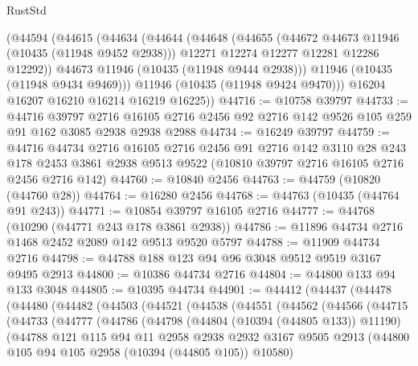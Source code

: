 \begin{lexlean}{RustStd}
\begin{coremodule}
      (@44594
        (@44615
          (@44634
            (@44644
              (@44648
                (@44655
                  (@44672 @44673 @11946 (@10435 (@11948 @9452 @2938)))
                  @12271
                  @12274
                  @12277
                  @12281
                  @12286
                  @12292))
              @44673
              @11946
              (@10435 (@11948 @9444 @2938)))
            @11946
            (@10435 (@11948 @9434 @9469)))
          @11946
          (@10435 (@11948 @9424 @9470)))
        @16204
        @16207
        @16210
        @16214
        @16219
        @16225))
@44716 := @10758 @39797
@44733 := @44716
    @39797
    @2716
    @16105
    @2716
    @2456
    @92
    @2716
    @142
    @9526
    @105
    @259
    @91
    @162
    @3085
    @2938
    @2938
    @2988
@44734 := @16249 @39797
@44759 := @44716
    @44734
    @2716
    @16105
    @2716
    @2456
    @91
    @2716
    @142
    @3110
    @28
    @243
    @178
    @2453
    @3861
    @2938
    @9513
    @9522
    (@10810 @39797 @2716 @16105 @2716 @2456 @2716 @142)
@44760 := @10840 @2456
@44763 := @44759 (@10820 (@44760 @28))
@44764 := @16280 @2456
@44768 := @44763 (@10435 (@44764 @91 @243))
@44771 := @10854 @39797 @16105 @2716
@44777 := @44768 (@10290 (@44771 @243 @178 @3861 @2938))
@44786 := @11896 @44734 @2716 @1468 @2452 @2089 @142 @9513 @9520 @5797
@44788 := @11909 @44734 @2716
@44798 := @44788 @188 @123 @94 @96 @3048 @9512 @9519 @3167 @9495 @2913
@44800 := @10386 @44734 @2716
@44804 := @44800 @133 @94 @133 @3048
@44805 := @10395 @44734
@44901 := @44412
    (@44437
      (@44478
        (@44480
          (@44482
            (@44503
              (@44521
                (@44538
                  (@44551
                    (@44562
                      (@44566
                        (@44715
                          (@44733
                            (@44777
                              (@44786
                                (@44798
                                  (@44804 (@10394 (@44805 @133)) @11190)
                                  (@44788
                                    @121
                                    @115
                                    @94
                                    @11
                                    @2958
                                    @2938
                                    @2932
                                    @3167
                                    @9505
                                    @2913
                                    (@44800 @105 @94 @105 @2958 (@10394 (@44805 @105)) @10580)

\end{coremodule}
\end{lexlean}
